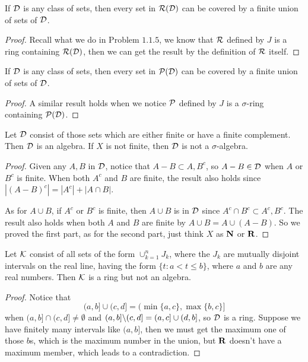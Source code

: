 \begin{pro}%
	If $\mathcal{D}$ is any class of sets, then every set in $\mathcal{R}(\mathcal{D})$ can be covered by a finite union of sets of $\mathcal{D}$.
\end{pro}
\begin{proof}
	Recall what we do in Problem $1.1.5$, we know that $\mathcal{R}$ defined by $J$ is a ring containing $\mathcal{R}(\mathcal{D})$, then  we can get the result by the definition of $\mathcal{R}$ itself.
\end{proof}

\begin{pro}%
	If $\mathcal{D}$ is any class of sets, then every set in $\mathcal{P}(\mathcal{D})$ can be covered by a finite union of sets of $\mathcal{D}$.
\end{pro}
\begin{proof}
	A similar result holds when we notice $\mathcal{P}$ defined by $J$ is a $\sigma$-ring containing $\mathcal{P}(\mathcal{D})$.
\end{proof}

\begin{pro}%
	Let $\mathcal{D}$ consist of those sets which are either finite or have a finite complement. Then $\mathcal{D}$ is an algebra. If $X$ is not finite, then $\mathcal{D}$ is not a $\sigma$-algebra.
\end{pro}
\begin{proof}
	Given any $A,B$ in $\mathcal{D}$, notice that $A-B\subset A,B^c$, so $A-B\in\mathcal{D}$ when $A$ or $B^c$ is finite. When both $A^c$ and $B$ are finite, the result also holds since $|(A-B)^c|=|A^c|+|A\cap B|$. 

	As for $A\cup B$, if $A^c$ or $B^c$ is finite, then $A\cup B$ is in $\mathcal{D}$ since $A^c\cap B^c\subset A^c,B^c$. The result also holds when both $A$ and $B$ are finite by $A\cup B=A\cup(A-B)$. So we proved the first part, as for the second part, just think $X$ as $\mathbf{N}$ or $\mathbf{R}$.
\end{proof}

\begin{pro}%
	Let $\mathcal{K}$ consist of all sets of the form $\cup_{k=1}^n J_k$, where the $J_k$ are mutually disjoint intervals on the real line, having the form $\{t\colon a<t\leq b\}$, where $a$ and $b$ are any real numbers. Then $\mathcal{K}$ is a ring but not an algebra.
\end{pro}
\begin{proof}
	Notice that \[(a,b]\cup (c,d]=(\min\{a,c\},\max\{b,c\}]\] when $(a,b]\cap (c,d]\neq\emptyset$ and $(a,b]\backslash (c,d]=(a,c]\cup (d,b]$, so $\mathcal{D}$ is a ring. Suppose we have finitely many intervals like $(a,b]$, then we must get the maximum one of those $b$s, which is the maximum number in the union, but $\mathbf{R}$ doesn't have  a maximum member, which leads to a contradiction.
\end{proof}

